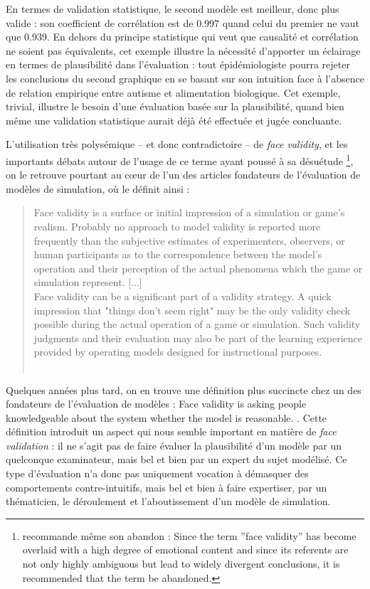 En termes de validation statistique, le second modèle est meilleur, donc plus valide : son coefficient de corrélation est de $0.997$ quand celui du premier ne vaut que $0.939$.
En dehors du principe statistique qui veut que causalité et corrélation ne soient pas équivalents, cet exemple illustre la nécessité d'apporter un éclairage en termes de plausibilité dans l'évaluation :
	tout épidémiologiste pourra rejeter les conclusions du second graphique en se basant sur son intuition face à l'absence de relation empirique entre autisme et alimentation biologique.
Cet exemple, trivial, illustre le besoin d'une évaluation basée sur la plausibilité, quand bien même une validation statistique aurait déjà été effectuée et jugée concluante.


L'utilisation très polysémique -- et donc contradictoire -- de \og \textit{face validity}\fg{}, et les importants débats autour de l'usage de ce terme ayant poussé à sa désuétude
\footnote{
	\cite[205]{mosier_critical_1947} recommande même son abandon : \og Since the term ''face validity'' has become overlaid with a high degree of emotional content and since its referents are not only highly ambiguous but lead to widely divergent conclusions, it is recommended that the term be abandoned.\fg{}
}, on le retrouve pourtant au cœur de l'un des articles fondateurs de l'évaluation de modèles de simulation, où \citeauthor{hermann_validation_1967} le définit ainsi :

\begin{quotation}
	\noindent \og
	Face validity is a surface or initial impression of a simulation or game's realism.
	Probably no approach to model validity is reported more frequently than the subjective estimates of experimenters, observers, or human participants as to the correspondence between the model's operation and their perception of the actual phenomena which the game or simulation represent.
	[...]\\
	Face validity can be a significant part of a validity strategy.
	A quick impression that "things don't seem right" may be the only validity check possible during the actual operation of a game or simulation.
	Such validity judgments and their evaluation may also be part of the learning experience provided by operating models designed for instructional purposes.
	\fg{}\\
	\mbox{}~ \hfill \textcite[221]{hermann_validation_1967}
\end{quotation}

Quelques années plus tard, on en trouve une définition plus succincte chez un des fondateurs de l'évaluation de modèles : \og Face validity is asking people knowledgeable about the system whether the model is reasonable.\fg{} \autocite[500]{sargent_validation_1979}.
Cette définition introduit un aspect qui nous semble important en matière de \textit{face validation} : il ne s'agit pas de faire évaluer la plausibilité d'un modèle par un quelconque examinateur, mais bel et bien par un expert du sujet modélisé.
Ce type d'évaluation n'a donc pas uniquement vocation à démasquer des comportements contre-intuitifs, mais bel et bien à faire expertiser, par un thématicien, le déroulement et l'aboutissement d'un modèle de simulation.

